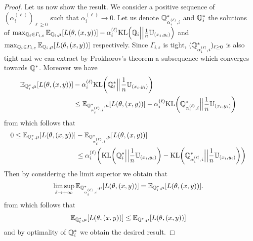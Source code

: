 \begin{proof}
Let us now show the result. We consider a positive sequence of $(\alpha_i^{(\ell)})_{\ell\geq0}$ such that $\alpha_i^{(\ell)}\to 0$.
Let us denote $\mathbb{Q}^{*}_{\alpha_i^{(\ell)},i}$ and $\mathbb{Q}^{*}_i$ the solutions of  $\max_{\QQ_i\in\Gamma_{i,\varepsilon}}\mathbb{E}_{\QQ_i,\mu}\left[\loss(\theta,(x,y))\right]-\alpha_i^{(\ell)}\text{KL}\left(\QQ_i\Big|\Big|\frac{1}{\numsamples}\mathbb{U}_{(x_i,y_i)}\right)$
and 
$\max_{\QQ_i\in\Gamma_{i,\varepsilon}}\mathbb{E}_{\QQ_i,\mu}\left[\loss(\theta,(x,y))\right]$ respectively.  Since $\Gamma_{i,\varepsilon}$ is tight, $(\mathbb{Q}^{*}_{\alpha_i^{(\ell)},i})_{\ell\geq 0}$ is also tight and we can extract by Prokhorov's theorem a subsequence which converges towards $\mathbb{Q}^{*}$. Moreover we have
\begin{align*}
 \mathbb{E}_{\QQ^{*}_i,\mu}\left[\loss(\theta,(x,y))\right] &-\alpha_i^{(\ell)}\text{KL}\left(\QQ^{*}_i\Big|\Big|\frac{1}{\numsamples}\mathbb{U}_{(x_i,y_i)}\right)\\
 &\leq \mathbb{E}_{\QQ^{*}_{\alpha_i^{(\ell)},i},\mu}\left[\loss(\theta,(x,y))\right] -\alpha_i^{(\ell)}\text{KL}\left(\QQ^{*}_{\alpha_i^{(\ell)},i}\Big|\Big|\frac{1}{\numsamples}\mathbb{U}_{(x_i,y_i)}\right)
\end{align*}
from which follows that
\begin{align*}
0\leq \mathbb{E}_{\QQ^{*}_i,\mu}\left[\loss(\theta,(x,y))\right] &-  \mathbb{E}_{\QQ^{*}_{\alpha_i^{(\ell)},i},\mu}\left[\loss(\theta,(x,y))\right]\\
&\leq \alpha_i^{(\ell)}\left(\text{KL}\left(\QQ^{*}_i\Big|\Big|\frac{1}{\numsamples}\mathbb{U}_{(x_i,y_i)}\right)- \text{KL}\left(\QQ^{*}_{\alpha_i^{(\ell)},i}\Big|\Big|\frac{1}{\numsamples}\mathbb{U}_{(x_i,y_i)}\right)\right)
\end{align*}
Then by considering the limit superior we obtain that
\begin{align*}
    \limsup_{\ell\to+\infty}\mathbb{E}_{\QQ^{*}_{\alpha_i^{(\ell)},i},\mu}\left[\loss(\theta,(x,y))\right] = \mathbb{E}_{\QQ^{*}_i,\mu}\left[\loss(\theta,(x,y))\right].
\end{align*}
from which follows that 
\begin{align*}
 \mathbb{E}_{\QQ^{*}_i,\mu}\left[\loss(\theta,(x,y))\right]\leq \mathbb{E}_{\QQ^{*},\mu}\left[\loss(\theta,(x,y))\right]
\end{align*}
and by optimality of $\mathbb{Q}^{*}_i$ we obtain the desired result. 
\end{proof}



